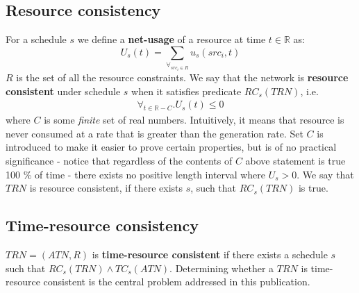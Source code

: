 \subsection{Resource consistency}
For a schedule $s$ we define a \textbf{net-usage} of a resource at time $t \in \mathbb{R}$ as:
\[
U_s(t) = \sum_{\forall_{src_i \in R}} u_s(src_i, t)
\]
$R$ is the set of all the resource constraints. We say that the network is \textbf{resource consistent} under schedule $s$ when it satisfies predicate $RC_s(TRN)$, i.e.
\begin{align}
\label{usage_for_all}\forall_{t \in {\mathbb{R} - C}} . U_s(t) \leq 0
\end{align}
where $C$ is some \textit{finite} set of real numbers. Intuitively, it means that resource is never consumed at a rate that is greater than the generation rate. Set $C$ is introduced to make it easier to prove certain properties, but is of no practical significance - notice that regardless of the contents of $C$ above statement is true 100 \% of time - there exists no positive length interval where $U_s > 0$. We say that $TRN$ is resource consistent, if there exists $s$, such that $RC_s(TRN)$ is true.

\subsection{Time-resource consistency}
$TRN=(ATN, R)$ is \textbf{time-resource consistent} if there exists a schedule $s$ such that $RC_s(TRN) \wedge TC_s(ATN)$. Determining whether a $TRN$ is time-resource consistent is the central problem addressed in this publication.

